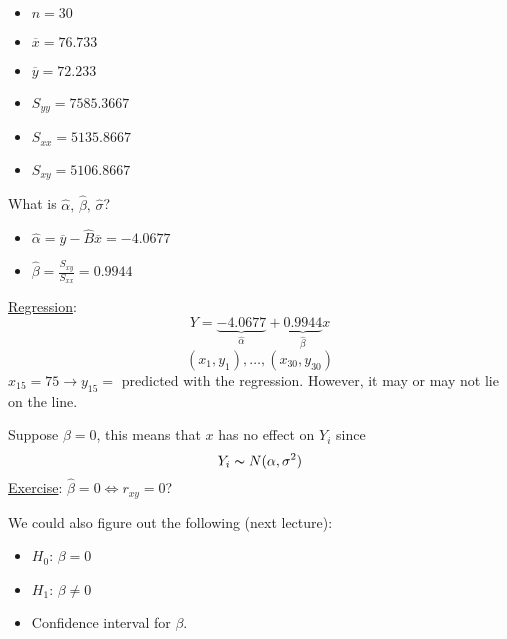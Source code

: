 \begin{exbox}
    \begin{example} $ \; $
        \begin{itemize}
            \item $ n=30 $
            \item $ \overline{x}=76.733 $
            \item $ \overline{y}=72.233 $
            \item $ S_{yy}=7585.3667 $
            \item $ S_{xx}=5135.8667 $
            \item $ S_{xy}=5106.8667 $
        \end{itemize}
        What is $ \hat{\alpha},\,\hat{\beta},\,\hat{\sigma} $?
        \begin{itemize}
            \item $ \hat{\alpha}=\overline{y}-\hat{B}\overline{x}=-4.0677 $
            \item $ \hat{\beta}=\frac{S_{xy}}{S_{xx}}=0.9944 $
        \end{itemize}
        \underline{Regression}:
        \[ Y=\underbrace{-4.0677}_{\hat{\alpha}}+\underbrace{0.9944}_{\hat{\beta}}x \]
        \[ (x_1,y_1),\ldots ,(x_{30},y_{30}) \]
        $ x_{15}=75 \rightarrow y_{15}= $ predicted with the regression. However, it may or may not lie
        on the line.

        Suppose $ \beta=0 $, this means that $ x $ has no effect on $ Y_i $ since
        \[ Y_i \thicksim N(\alpha,\sigma^2) \]
        \underline{Exercise}: $ \hat{\beta}=0\iff r_{xy}=0 $?

        We could also figure out the following (next lecture):
        \begin{itemize}
            \item $ H_0 $: $ \beta=0 $
            \item $ H_1 $: $ \beta\neq 0 $
            \item Confidence interval for $ \beta $.
        \end{itemize}
    \end{example}
\end{exbox}
